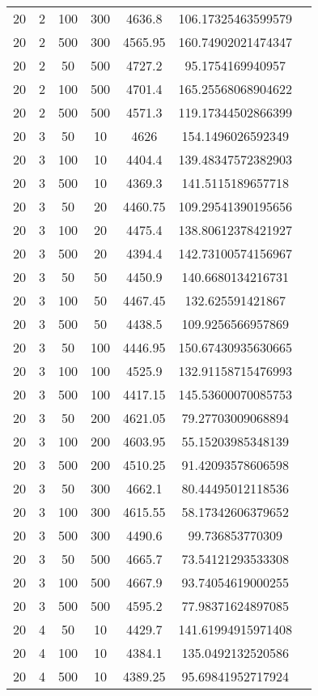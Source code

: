 {\begin{longtabu}{S
S
S
S
S
S[round-mode=places, round-precision=0]
S[round-mode=places, round-precision=0]}
20 & 2 & 100 & 300 & 4636.8 & 106.17325463599579 \\
20 & 2 & 500 & 300 & 4565.95 & 160.74902021474347 \\
20 & 2 & 50 & 500 & 4727.2 & 95.1754169940957 \\
20 & 2 & 100 & 500 & 4701.4 & 165.25568068904622 \\
20 & 2 & 500 & 500 & 4571.3 & 119.17344502866399 \\
20 & 3 & 50 & 10 & 4626 & 154.1496026592349 \\
20 & 3 & 100 & 10 & 4404.4 & 139.48347572382903 \\
20 & 3 & 500 & 10 & 4369.3 & 141.5115189657718 \\
20 & 3 & 50 & 20 & 4460.75 & 109.29541390195656 \\
20 & 3 & 100 & 20 & 4475.4 & 138.80612378421927 \\
20 & 3 & 500 & 20 & 4394.4 & 142.73100574156967 \\
20 & 3 & 50 & 50 & 4450.9 & 140.6680134216731 \\
20 & 3 & 100 & 50 & 4467.45 & 132.625591421867 \\
20 & 3 & 500 & 50 & 4438.5 & 109.9256566957869 \\
20 & 3 & 50 & 100 & 4446.95 & 150.67430935630665 \\
20 & 3 & 100 & 100 & 4525.9 & 132.91158715476993 \\
20 & 3 & 500 & 100 & 4417.15 & 145.53600070085753 \\
20 & 3 & 50 & 200 & 4621.05 & 79.27703009068894 \\
20 & 3 & 100 & 200 & 4603.95 & 55.15203985348139 \\
20 & 3 & 500 & 200 & 4510.25 & 91.42093578606598 \\
20 & 3 & 50 & 300 & 4662.1 & 80.44495012118536 \\
20 & 3 & 100 & 300 & 4615.55 & 58.17342606379652 \\
20 & 3 & 500 & 300 & 4490.6 & 99.736853770309 \\
20 & 3 & 50 & 500 & 4665.7 & 73.54121293533308 \\
20 & 3 & 100 & 500 & 4667.9 & 93.74054619000255 \\
20 & 3 & 500 & 500 & 4595.2 & 77.98371624897085 \\
20 & 4 & 50 & 10 & 4429.7 & 141.61994915971408 \\
20 & 4 & 100 & 10 & 4384.1 & 135.0492132520586 \\
20 & 4 & 500 & 10 & 4389.25 & 95.69841952717924 \\

\end{longtabu}}
